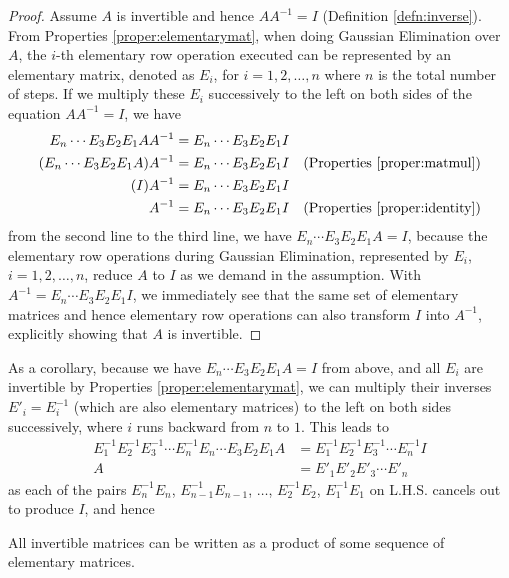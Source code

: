 \begin{proof}
Assume $A$ is invertible and hence $AA^{-1} = I$ (Definition \ref{defn:inverse}). From Properties \ref{proper:elementarymat}, when doing Gaussian Elimination over $A$, the $i$-th elementary row operation executed can be represented by an elementary matrix, denoted as $E_{i}$, for $i = 1,2,\ldots,n$ where $n$ is the total number of steps. If we multiply these $E_{i}$ successively to the left on both sides of the equation $AA^{-1} = I$, we have
\begin{align*}
E_n \cdots E_{3}E_{2}E_{1} AA^{-1} &= E_n \cdots E_{3}E_{2}E_{1}I \\
(E_n \cdots E_{3}E_{2}E_{1}A) A^{-1} &= E_n \cdots E_{3}E_{2}E_{1}I & \text{(Properties \ref{proper:matmul})} \\
(I)A^{-1} &= E_n \cdots E_{3}E_{2}E_{1}I \\
A^{-1} &= E_n \cdots E_{3}E_{2}E_{1}I & \text{(Properties \ref{proper:identity})}
\end{align*}
from the second line to the third line, we have $E_n \cdots E_{3}E_{2}E_{1}A = I$, because the elementary row operations during Gaussian Elimination, represented by $E_i$, $i = 1,2,\ldots,n$, reduce $A$ to $I$ as we demand in the assumption. With $A^{-1} = E_n \cdots E_{3}E_{2}E_{1}I$, we immediately see that the same set of elementary matrices and hence elementary row operations can also transform $I$ into $A^{-1}$, explicitly showing that $A$ is invertible.    
\end{proof}
As a corollary, because we have $E_n \cdots E_{3}E_{2}E_{1}A = I$ from above, and all $E_i$ are invertible by Properties \ref{proper:elementarymat}, we can multiply their inverses $E'_i = E_i^{-1}$ (which are also elementary matrices) to the left on both sides successively, where $i$ runs backward from $n$ to $1$. This leads to
\begin{align}
E_{1}^{-1}E_{2}^{-1}E_{3}^{-1}\cdots E_n^{-1}E_n \cdots E_{3}E_{2}E_{1}A &= E_{1}^{-1}E_{2}^{-1}E_{3}^{-1}\cdots E_n^{-1}I \nonumber \\
A &= E'_{1}E'_{2}E'_{3}\cdots E'_n
\end{align}
as each of the pairs $E_n^{-1}E_n$, $E_{n-1}^{-1}E_{n-1}$, $\ldots$, $E_2^{-1}E_2$, $E_1^{-1}E_1$ on L.H.S. cancels out to produce $I$, and hence
\begin{proper}
\label{proper:invseqelement}
All invertible matrices can be written as a product of some sequence of elementary matrices. 
\end{proper}

